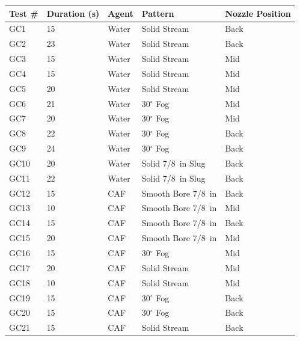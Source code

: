 \documentclass[12pt,oneside]{book}
\begin{document}
\begin{table}[!ht]
\footnotesize
\centering
{}\label{tab:spray_density_tests}
\begin{tabular}{lllll}
\toprule[1.5pt]
Test \#    &  Duration (s)  & Agent  &  Pattern            & Nozzle Position  \\
\midrule
GC1        &  15            & Water  &  Solid Stream       & Back             \\
GC2        &  23            & Water  &  Solid Stream       & Back             \\
GC3        &  15            & Water  &  Solid Stream       & Mid              \\
GC4        &  15            & Water  &  Solid Stream       & Mid              \\
GC5        &  20            & Water  &  Solid Stream       & Mid              \\
GC6        &  21            & Water  &  30$^{\circ}$ Fog   & Mid              \\
GC7        &  20            & Water  &  30$^{\circ}$ Fog   & Mid              \\
GC8        &  22            & Water  &  30$^{\circ}$ Fog   & Back             \\
GC9        &  24            & Water  &  30$^{\circ}$ Fog   & Back             \\
GC10       &  20            & Water  &  Solid 7/8~in Slug  & Back             \\
GC11       &  22            & Water  &  Solid 7/8~in Slug  & Back             \\
GC12       &  15            & CAF    &  Smooth Bore 7/8~in & Back             \\
GC13       &  10            & CAF    &  Smooth Bore 7/8~in & Mid              \\
GC14       &  15            & CAF    &  Smooth Bore 7/8~in & Back             \\
GC15       &  20            & CAF    &  Smooth Bore 7/8~in & Mid              \\
GC16       &  15            & CAF    &  30$^{\circ}$ Fog   & Mid              \\
GC17       &  20            & CAF    &  Solid Stream       & Mid             \\
GC18       &  10            & CAF    &  Solid Stream       & Mid             \\
GC19       &  15            & CAF    &  30$^{\circ}$ Fog   & Back             \\
GC20       &  15            & CAF    &  30$^{\circ}$ Fog   & Back             \\
GC21       &  15            & CAF    &  Solid Stream       & Back             \\

\bottomrule[1.25pt]
\end{tabular}\par
\end{table}
\end{document}
